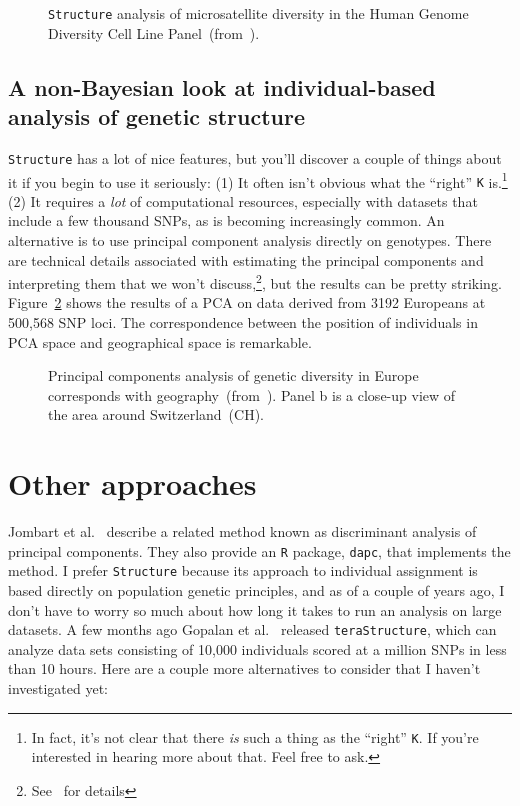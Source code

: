 \begin{figure}
\caption{{\tt Structure} analysis of microsatellite diversity in the
  Human Genome Diversity Cell Line
  Panel~(from~\cite{Rosenberg-etal-2002}).}\label{fig:HGDP-CEPH} 
\end{figure}

\subsection*{A non-Bayesian look at individual-based analysis of
  genetic structure}

{\tt Structure} has a lot of nice features, but you'll discover a
couple of things about it if you begin to use it seriously: (1) It
often isn't obvious what the ``right'' {\tt K} is.\footnote{In fact,
  it's not clear that there {\it is\/} such a thing as the ``right''
  {\tt K}. If you're interested in hearing more about that. Feel free
  to ask.} (2) It requires a {\it lot\/} of computational resources,
especially with datasets that include a few thousand SNPs, as is
becoming increasingly common. An alternative is to use principal
component analysis directly on genotypes. There are technical details
associated with estimating the principal components and interpreting
them that we won't discuss,\footnote{See~\cite{Novembre-Stephens-2008}
  for details}, but the results can be pretty
striking. Figure~\ref{fig:human-PCA} shows the results of a PCA on
data derived from 3192 Europeans at 500,568 SNP loci. The
correspondence between the position of individuals in PCA space and
geographical space is remarkable. 

\begin{figure}
\caption{Principal components analysis of genetic diversity in Europe
  corresponds with
  geography~(from~\cite{Novembre-etal-2008}). Panel b is a close-up
  view of the area around Switzerland~(CH).}\label{fig:human-PCA}
\end{figure}

\section*{Other approaches}

Jombart et al.~\cite{Jombart-etal-2010} describe a related method
known as discriminant analysis of principal components. They also
provide an {\tt R} package, {\tt dapc}, that implements the
method. I prefer
{\tt Structure} because its approach to individual assignment is based
directly on population genetic principles, and as of a couple of years
ago, I don't have to worry so much about how long it takes to run an
analysis on large datasets. A few months ago Gopalan et
al.~\cite{Gopalan-etal-2016} released {\tt teraStructure}, which can
analyze data sets consisting of 10,000 individuals scored at a million
SNPs in less than 10
hours. Here are a couple
more alternatives to consider that I haven't investigated yet:

